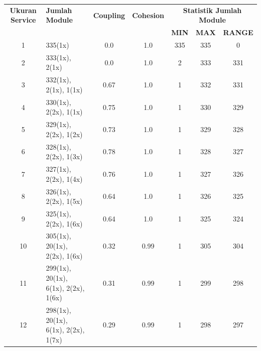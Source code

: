 \begingroup
\setlength{\LTleft}{-20cm plus -1fill}
\setlength{\LTright}{\LTleft}
\begin{small}
\begin{longtable}{|c|p{4cm}|c|c|c|c|c|}
	\hline
	\textbf{Ukuran Service} & \textbf{Jumlah Module} & \textbf{Coupling} & \textbf{Cohesion} & \multicolumn{3}{c|}{\textbf{Statistik Jumlah Module}} \\
	\cline{5-7}
	&  &  &  & \textbf{MIN} & \textbf{MAX} & \textbf{RANGE} \\
	\hline
	\endfirsthead
	\hline 
  1 & 335(1x) & \cellcolor{colorGood}  0.0 & \cellcolor{colorGood} 1.0 & 335 & 335 & \cellcolor{colorGood} 0 \\   \hline
  2 & 333(1x), 2(1x) & \cellcolor{colorGood}  0.0 & \cellcolor{colorGood} 1.0 & 2 & 333 & \cellcolor{colorBad} 331 \\   \hline
  3 & 332(1x), 2(1x), 1(1x) & \cellcolor{colorGood}  0.67 & \cellcolor{colorGood} 1.0 & 1 & 332 & \cellcolor{colorBad} 331 \\   \hline
  4 & 330(1x), 2(2x), 1(1x) & \cellcolor{colorGood}  0.75 & \cellcolor{colorGood} 1.0 & 1 & 330 & \cellcolor{colorBad} 329 \\   \hline
  5 & 329(1x), 2(2x), 1(2x) & \cellcolor{colorGood}  0.73 & \cellcolor{colorGood} 1.0 & 1 & 329 & \cellcolor{colorBad} 328 \\   \hline
  6 & 328(1x), 2(2x), 1(3x) & \cellcolor{colorGood}  0.78 & \cellcolor{colorGood} 1.0 & 1 & 328 & \cellcolor{colorBad} 327 \\   \hline
  7 & 327(1x), 2(2x), 1(4x) & \cellcolor{colorGood}  0.76 & \cellcolor{colorGood} 1.0 & 1 & 327 & \cellcolor{colorBad} 326 \\   \hline
  8 & 326(1x), 2(2x), 1(5x) & \cellcolor{colorGood}  0.64 & \cellcolor{colorGood} 1.0 & 1 & 326 & \cellcolor{colorBad} 325 \\   \hline
  9 & 325(1x), 2(2x), 1(6x) & \cellcolor{colorGood}  0.64 & \cellcolor{colorGood} 1.0 & 1 & 325 & \cellcolor{colorBad} 324 \\   \hline
  10 & 305(1x), 20(1x), 2(2x), 1(6x) & \cellcolor{colorGood}  0.32 & \cellcolor{colorGood} 0.99 & 1 & 305 & \cellcolor{colorBad} 304 \\   \hline
  11 & 299(1x), 20(1x), 6(1x), 2(2x), 1(6x) & \cellcolor{colorGood}  0.31 & \cellcolor{colorGood} 0.99 & 1 & 299 & \cellcolor{colorBad} 298 \\   \hline
  12 & 298(1x), 20(1x), 6(1x), 2(2x), 1(7x) & \cellcolor{colorGood}  0.29 & \cellcolor{colorGood} 0.99 & 1 & 298 & \cellcolor{colorBad} 297 \\   \hline

\end{longtable}
\end{small}
